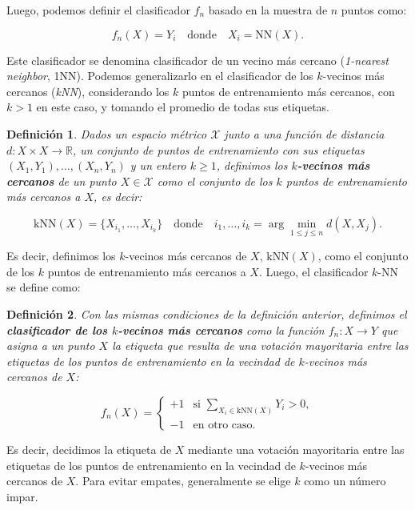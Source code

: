 \documentclass{report}
\newtheorem{dfn}{Definición}[section]
\begin{document}
Luego, podemos definir el clasificador \(f_n\) basado en la muestra de \(n\) puntos como:

\[
f_n(X) = Y_i \quad \text{donde} \quad X_i = \text{NN}(X).
\]

Este clasificador se denomina clasificador de un vecino más cercano (\textit{1-nearest neighbor}, 1NN). 
Podemos generalizarlo en el clasificador de los \(k\)-vecinos más cercanos (\textit{kNN}), considerando los \(k\) puntos de 
entrenamiento más cercanos, con $k>1$ en este caso, y tomando el promedio de todas sus etiquetas. \newline


\begin{dfn}
    Dados un espacio métrico \(\mathcal{X}\) junto a una función de distancia \(d : X \times X \to \mathbb{R}\), 
    un conjunto de puntos de entrenamiento con sus etiquetas \((X_1, Y_1), \dots, (X_n, Y_n)\) y un entero \(k \geq 1\), 
    definimos los \textbf{\(k\)-vecinos más cercanos} de un punto \(X \in \mathcal{X} \) como el conjunto de los \(k\) puntos 
    de entrenamiento más cercanos a \(X\), es decir:

    \[
    \text{kNN}(X) = \{X_{i_1}, \dots, X_{i_k}\} \quad \text{donde} \quad i_1, \dots, i_k = \arg\min_{1 \leq j \leq n} d(X, X_j).
    \]
\end{dfn}

Es decir, definimos los 
\(k\)-vecinos más cercanos de \(X\), \(\text{kNN}(X)\), como el conjunto de los \(k\) puntos de 
entrenamiento más cercanos a \(X\). Luego, el clasificador \(k\)-NN se define como:

\begin{dfn}
    Con las mismas condiciones de la definición anterior,
    definimos el \textbf{clasificador de los \(k\)-vecinos más cercanos} como la función \(f_n : X \to Y\) 
    que asigna a un punto \(X\) la etiqueta que resulta de una votación mayoritaria entre las etiquetas 
    de los puntos de entrenamiento en la vecindad de \(k\)-vecinos más cercanos de \(X\):


    \[
f_n(X) = 
\begin{cases} 
+1 & \text{si } \underset{{X_i \in \text{kNN}(X)}}{\sum}Y_i > 0, \\ 
-1 & \text{en otro caso}.
\end{cases}
\]
\end{dfn}


Es decir, decidimos la etiqueta de \(X\) mediante una votación mayoritaria entre las etiquetas de los 
puntos de entrenamiento en la vecindad de \(k\)-vecinos más cercanos de \(X\). Para evitar empates, 
generalmente se elige \(k\) como un número impar.\newline
\end{document}
